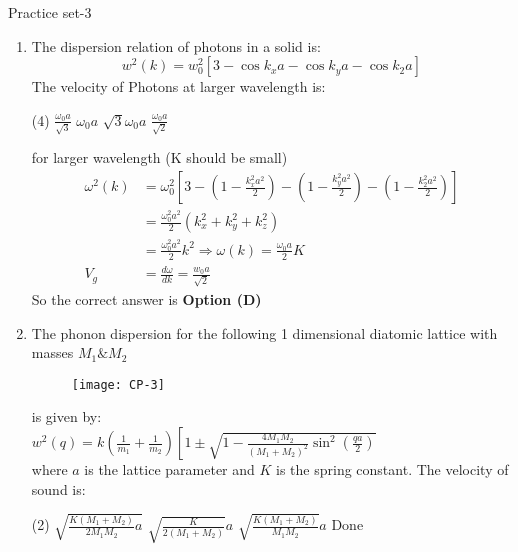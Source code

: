 \newpage
\begin{abox}
	Practice set-3
\end{abox}
\begin{enumerate}
	\item 
	The dispersion relation of photons in a solid is:
	$$
	w^{2}(k)=w_{0}^{2}\left[3-\cos k_{x} a-\cos k_{y} a-\cos k_{2} a\right]
	$$
	The velocity of Photons at larger wavelength is:
	\begin{tasks}(4)
		\task[\textbf{a.}] $\frac{\omega_{0} a}{\sqrt{3}}$
		\task[\textbf{b.}]$\omega_{0} a$
		\task[\textbf{c.}]$\sqrt{3} \omega_{0} a$
		\task[\textbf{d.}] $\frac{\omega_{0} a}{\sqrt{2}}$
	\end{tasks}
\begin{answer}
	for larger wavelength (K should be small) 
	\begin{align*}
	\omega^{2}(k)&=\omega_{0}^{2}\left[3-\left(1-\frac{k_{x}^{2} a^{2}}{2}\right)-\left(1-\frac{k_{y}^{2} a^{2}}{2}\right)-\left(1-\frac{k_{2}^{2} a^{2}}{2}\right)\right]\\
	&=\frac{\omega_{0}^{2} a^{2}}{2}\left(k_{x}^{2}+k_{y}^{2}+k_{z}^{2}\right) \\
	&=\frac{\omega_{0}^{2} a^{2}}{2} k^{2} \Rightarrow \omega(k)=\frac{\omega_{0} a}{2} K\\
	V_{g}&=\frac{d \omega}{d k}=\frac{w_{0} a}{\sqrt{2}}
	\end{align*}
	So the correct answer is \textbf{Option (D)}
\end{answer}
\item 
	The phonon dispersion for the following 1 dimensional diatomic lattice with masses $M_{1} \& M_{2}$
	\begin{figure}[H]
		\centering
		\texttt{[image: CP-3]}
	\end{figure}
	is given by:\\
	$w^{2}(q)=k\left(\frac{1}{m_{1}}+\frac{1}{m_{2}}\right)\left[1 \pm \sqrt{1-\frac{4 M_{1} M_{2}}{\left(M_{1}+M_{2}\right)^{2}} \sin ^{2}\left(\frac{q a}{2}\right)}\right.$\\
	where $a$ is the lattice parameter and $K$ is the spring constant. The velocity of sound is:
\begin{tasks}(2)
	\task[\textbf{a.}]$\sqrt{\frac{K\left(M_{1}+M_{2}\right)}{2 M_{1} M_{2}} a}$
	\task[\textbf{b.}]$\sqrt{\frac{K}{2\left(M_{1}+M_{2}\right)}} a$
	\task[\textbf{c.}]$\sqrt{\frac{K\left(M_{1}+M_{2}\right)}{M_{1} M_{2}}} a$
	\task[\textbf{d.}] Done
\end{tasks}
\begin{answer}

\end{answer}
\end{enumerate}
